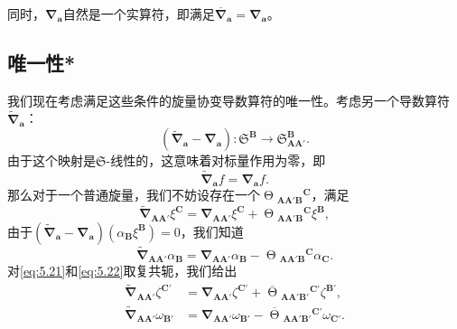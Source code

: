 同时，$\boldsymbol{\nabla }_{\boldsymbol{a}}$自然是一个实算符，即满足$\overline{\boldsymbol{\nabla }}_{\boldsymbol{a}} =\boldsymbol{\nabla }_{\boldsymbol{a}}$。


\subsection{唯一性*}

我们现在考虑满足这些条件的旋量协变导数算符的唯一性。考虑另一个导数算符$\tilde{\boldsymbol{\nabla }}_{\boldsymbol{a}}$：
\begin{equation*}
	(\tilde{\boldsymbol{\nabla }}_{\boldsymbol{a}} -\boldsymbol{\nabla }_{\boldsymbol{a}} ):\mathfrak{S}^{\boldsymbol{B}}\rightarrow \mathfrak{S}_{\boldsymbol{AA} '}^{\boldsymbol{B}} .
\end{equation*}
由于这个映射是$\mathfrak{S}$-线性的，这意味着对标量作用为零，即
\begin{equation}
	\tilde{\boldsymbol{\nabla }}_{\boldsymbol{a}} f=\boldsymbol{\nabla }_{\boldsymbol{a}} f.
	\label{eq:5.20}
\end{equation}
那么对于一个普通旋量，我们不妨设存在一个$\upTheta {_{\boldsymbol{AA} '\boldsymbol{B}}}^{\boldsymbol{C}}$，满足
\begin{equation}
	\tilde{\boldsymbol{\nabla }}_{\boldsymbol{AA} '} \xi ^{\boldsymbol{C}} =\boldsymbol{\nabla }_{\boldsymbol{AA} '} \xi ^{\boldsymbol{C}} +\upTheta {_{\boldsymbol{AA} '\boldsymbol{B}}}^{\boldsymbol{C}} \xi ^{\boldsymbol{B}} ,
	\label{eq:5.21}
\end{equation}
由于$(\tilde{\boldsymbol{\nabla }}_{\boldsymbol{a}} -\boldsymbol{\nabla }_{\boldsymbol{a}}) (\alpha _{\boldsymbol{B}} \xi ^{\boldsymbol{B}} )=0$，我们知道
\begin{equation}
	\tilde{\boldsymbol{\nabla }}_{\boldsymbol{AA} '} \alpha _{\boldsymbol{B}} =\boldsymbol{\nabla }_{\boldsymbol{AA} '} \alpha _{\boldsymbol{B}} -\upTheta {_{\boldsymbol{AA} '\boldsymbol{B}}}^{\boldsymbol{C}} \alpha _{\boldsymbol{C}} .
	\label{eq:5.22}
\end{equation}
对\ref{eq:5.21}和\ref{eq:5.22}取复共轭，我们给出
\begin{equation*}
	\begin{aligned}
		\tilde{\boldsymbol{\nabla }}_{\boldsymbol{AA} '} \zeta ^{\boldsymbol{C} '} & =\boldsymbol{\nabla }_{\boldsymbol{AA} '} \zeta ^{\boldsymbol{C} '} +\overline{\upTheta }{_{\boldsymbol{AA} '\boldsymbol{B} '}}^{\boldsymbol{C} '} \zeta ^{\boldsymbol{B} '} ,\\
		\tilde{\boldsymbol{\nabla }}_{\boldsymbol{AA} '} \omega _{\boldsymbol{B} '} & =\boldsymbol{\nabla }_{\boldsymbol{AA} '} \omega _{\boldsymbol{B} '} -\overline{\upTheta }{_{\boldsymbol{AA} '\boldsymbol{B} '}}^{\boldsymbol{C} '} \omega _{\boldsymbol{C} '} .
	\end{aligned}
\end{equation*}
